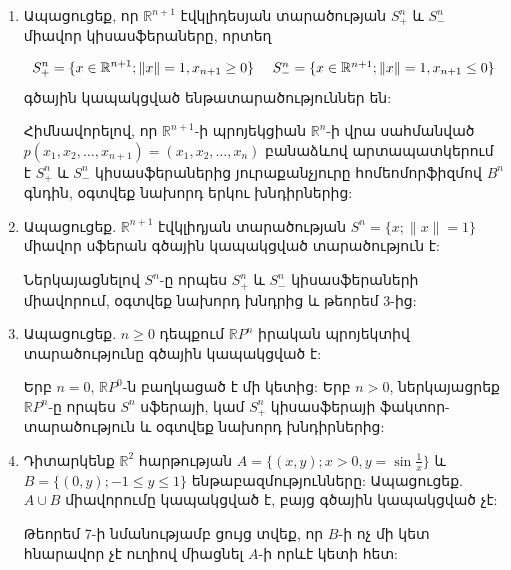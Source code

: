\begin{enumerate}[label=\thesection.\arabic*.]
\item Ապացուցեք, որ $\mathbb{R}^{n+1}$ էվկլիդեսյան տարածության $S^n_+$ և $S^n_-$ միավոր կիսասֆերաները, որտեղ

\[ 
S^n_+ = \{x \in \mathbb{R}^{n+1}; \|x\|=1, x_{n+1} \ge 0\}$ \quad $S^n_- = \{x \in \mathbb{R}^{n+1}; \|x\|=1, x_{n+1} \le 0\}
\]
գծային կապակցված ենթատարածություններ են:
\begin{hint}
Հիմնավորելով, որ $\mathbb{R}^{n+1}$-ի պրոյեկցիան $\mathbb{R}^n$-ի վրա սահմանված $p(x_1, x_2, \dots, x_{n+1}) = (x_1, x_2, \dots, x_n)$ բանաձևով արտապատկերում է $S^n_+$ և $S^n_-$ կիսասֆերաներից յուրաքանչյուրը հոմեոմորֆիզմով $B^n$ գնդին, օգտվեք նախորդ երկու խնդիրներից:
\end{hint}

\item Ապացուցեք. $\mathbb{R}^{n+1}$ էվկլիդյան տարածության $S^n = \{x; \|x\|=1\}$ միավոր սֆերան գծային կապակցված տարածություն է:
\begin{hint}
Ներկայացնելով $S^n$-ը որպես $S^n_+$ և $S^n_-$ կիսասֆերաների միավորում, օգտվեք նախորդ խնդրից և թեորեմ 3-ից:
\end{hint}

\item Ապացուցեք. $n \ge 0$ դեպքում $\mathbb{R}P^n$ իրական պրոյեկտիվ տարածությունը գծային կապակցված է:
\begin{hint}
Երբ $n=0$, $\mathbb{R}P^0$-ն բաղկացած է մի կետից: Երբ $n > 0$, ներկայացրեք $\mathbb{R}P^n$-ը որպես $S^n$ սֆերայի, կամ $S^n_+$ կիսասֆերայի ֆակտոր-տարածություն և օգտվեք նախորդ խնդիրներից:
\end{hint}

\item Դիտարկենք $\mathbb{R}^2$ հարթության $A = \{(x, y); x > 0, y = \sin \frac{1}{x}\}$ և $B = \{(0, y); -1 \le y \le 1\}$ ենթաբազմությունները: Ապացուցեք. $A \cup B$ միավորումը կապակցված է, բայց գծային կապակցված չէ:
\begin{hint}
Թեորեմ 7-ի նմանությամբ ցույց տվեք, որ $B$-ի ոչ մի կետ հնարավոր չէ ուղիով միացնել $A$-ի որևէ կետի հետ:
\end{hint}

\end{enumerate}
